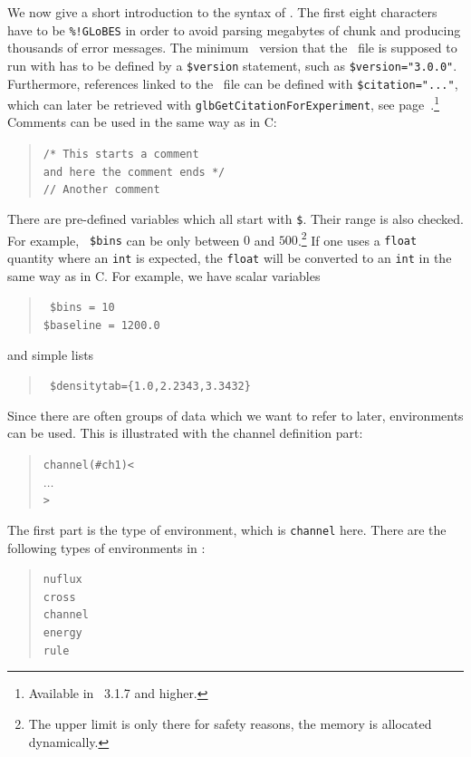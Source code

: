 We now give a short introduction to the syntax of \AEDL .
 The first eight characters have to be {\tt \%!GLoBES}
in order to avoid parsing megabytes of chunk
 and producing thousands of error messages.  The minimum
\GLOBES\ version that the \AEDL\ file is supposed to run with has to be
defined by a {\tt \$version} statement, such as
{\tt \$version="3.0.0"}.
Furthermore, references linked to the \AEDL\ file can be defined with {\tt \$citation="..."},
which can later be retrieved with {\tt glbGetCitationForExperiment}, see page~\pageref{glbGetCitationForExperiment}.\footnote{Available in \GLOBES\ 3.1.7 and higher.}
 \label{citation}
%
Comments can be used in the same way as in C:
\begin{quote}
{\tt /* This starts a comment\\
 and here the comment ends */ \\
// Another comment
}
\end{quote}
There are pre-defined variables which all start with {\tt \$}. Their range
is also checked. For example,  {\tt 
\$bins} can be only between $0$ and $500$.\footnote{The upper limit is 
only there for safety reasons, the memory is allocated dynamically.} If one uses a {\tt float} quantity where  an {\tt int} is expected, the {\tt float} will be converted to an {\tt int} in the same way as in C.  For example, we have scalar variables
\begin{quote}
{\tt
\$bins = 10\\
\$baseline = 1200.0
}
\end{quote}
and simple lists
\begin{quote}
{\tt
\$densitytab=\{1.0,2.2343,3.3432\} 
}
\end{quote}
%
Since there are often groups of data which we want to refer to later,
environments can be used. This is illustrated 
with the channel definition part:
\begin{quote}
{\tt channel(\#ch1)<\\
\tb  $\ldots$\\
>
}
\end{quote}
The first part is the type of environment, which is {\tt channel} here. 
There are the following types of environments in \AEDL :
\begin{quote}
{\tt nuflux\\
cross\\
channel\\
energy\\
rule
}
\end{quote}
